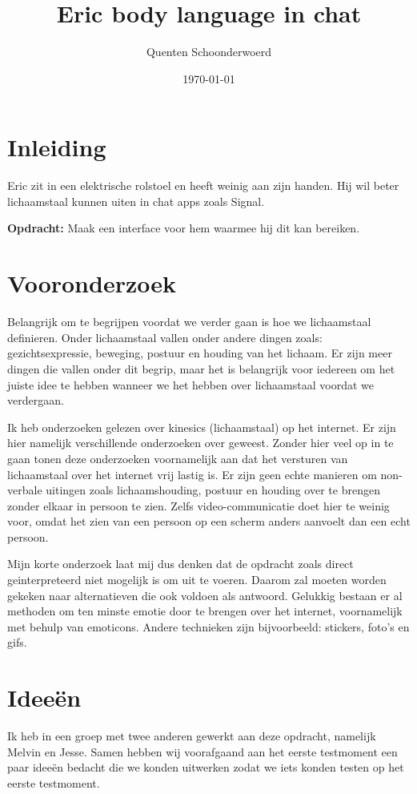 \documentclass[12pt]{article}
\title{\fontsize{30}{36}\textbf{Eric body language in chat}}
\author{Quenten Schoonderwoerd}
\date{\today}
\begin{document}
\maketitle

\section{Inleiding}

Eric zit in een elektrische rolstoel en heeft weinig aan zijn handen.
Hij wil beter lichaamstaal kunnen uiten in chat apps zoals Signal.

\textbf{Opdracht:}
Maak een interface voor hem waarmee hij dit kan bereiken.

\section{Vooronderzoek}

Belangrijk om te begrijpen voordat we verder gaan is hoe we lichaamstaal definieren.
Onder lichaamstaal vallen onder andere dingen zoals: gezichtsexpressie, beweging, postuur en houding van het lichaam.
Er zijn meer dingen die vallen onder dit begrip, maar het is belangrijk voor iedereen om het juiste idee te hebben wanneer we het hebben over lichaamstaal voordat we verdergaan.

Ik heb onderzoeken gelezen over kinesics (lichaamstaal) op het internet.
Er zijn hier namelijk verschillende onderzoeken over geweest.
Zonder hier veel op in te gaan tonen deze onderzoeken voornamelijk aan dat het versturen van lichaamstaal over het internet vrij lastig is.
Er zijn geen echte manieren om non-verbale uitingen zoals lichaamshouding, postuur en houding over te brengen zonder elkaar in persoon te zien.
Zelfs video-communicatie doet hier te weinig voor, omdat het zien van een persoon op een scherm anders aanvoelt dan een echt persoon.

Mijn korte onderzoek laat mij dus denken dat de opdracht zoals direct geinterpreteerd niet mogelijk is om uit te voeren.
Daarom zal moeten worden gekeken naar alternatieven die ook voldoen als antwoord.
Gelukkig bestaan er al methoden om ten minste emotie door te brengen over het internet, voornamelijk met behulp van emoticons.
Andere technieken zijn bijvoorbeeld: stickers, foto's en gifs.



\clearpage\section{Ideeën}
Ik heb in een groep met twee anderen gewerkt aan deze opdracht, namelijk Melvin en Jesse.
Samen hebben wij voorafgaand aan het eerste testmoment een paar ideeën bedacht die we konden uitwerken zodat we iets konden testen op het eerste testmoment.
\end{document}
